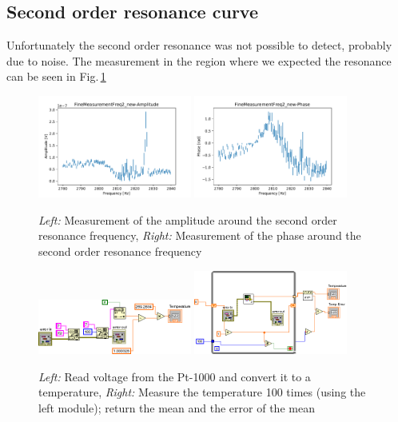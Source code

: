 \subsection{Second order resonance curve}
Unfortunately the second order resonance was not possible to detect, probably due to noise. The measurement in the region where we expected the resonance can be seen in Fig.\,\ref{fig7}

\begin{figure}[h]
	\centering
	\includegraphics[width=0.45\textwidth]{figures/FineMeasurementFreq2_newamp.pdf}
	\includegraphics[width=0.45\textwidth]{figures/FineMeasurementFreq2_newphase.pdf}
	\caption{\emph{Left:} Measurement of the amplitude around the second order resonance frequency, \emph{Right:} Measurement of the phase around the second order resonance frequency}
	\label{fig7}
\end{figure}

\begin{figure}[h]
	\centering
	\includegraphics[width=0.45\textwidth]{figures/GetTemperatured.png}
	\includegraphics[width=0.45\textwidth]{figures/MeasureTemperatured.png}
	\caption{\emph{Left:} Read voltage from the Pt-1000 and convert it to a temperature, \emph{Right:} Measure the temperature 100 times (using the left module); return the mean and the error of the mean}
	\label{fig8}
\end{figure}

